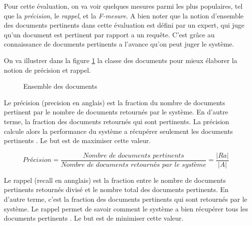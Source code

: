 Pour cette évaluation, on va voir quelques mesures parmi les plus populaires, tel que la \textit{précision}, le \textit{rappel}, et la \textit{F-mesure}. A bien noter que la notion d'ensemble des documents pertinents dans cette évaluation est défini par un expert, qui juge qu'un document est pertinent par rapport a un requête. C'est grâce au connaissance de documents pertinents a l'avance qu'on peut juger le système.

On va illustrer dans la figure \ref{precision-recall} la classe des documents pour mieux élaborer la notion de précision et rappel.
\begin{figure}[htbp]
	\begin{center}
		\caption{Ensemble des documents \citep{modern-ir}}
	\end{center}
	\label{precision-recall}
\end{figure}

Le précision (precision en anglais) est la fraction du nombre de documents pertinent par le nombre de documents retournés par le système. En d'autre terme, la fraction des documents retournés qui sont pertinents. La précision calcule alors la performance du système a récupérer seulement les documents pertinents \citep*{evaluation-of-ir-system, ir-on-web,vsm-for-arabic-language}. Le but est de maximiser cette valeur.

\[
	Précision = \frac{\textit{Nombre de documents pertinents}}{\textit{Nombre de documents retournés par le système}} = \frac{|Ra|}{|A|}
\]

Le rappel (recall en annglais) est la fraction entre le nombre de documents pertinents retournés divisé et le nombre total des documents pertinents. En d'autre terme, c'est la fraction des documents pertinents qui sont retournés par le système. Le rappel permet de savoir comment le système a bien récupérer tous les documents pertinents \citep*{evaluation-of-ir-system, ir-on-web,vsm-for-arabic-language}. Le but est de minimiser cette valeur.

